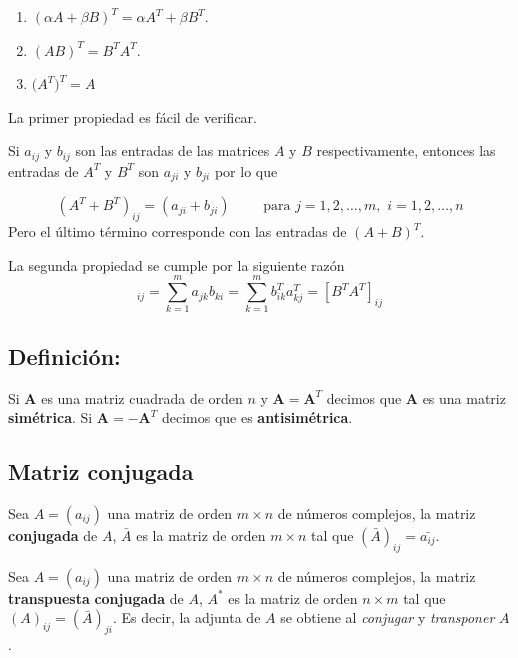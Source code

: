 \documentclass[
]{article}
\providecommand{\tightlist}{%
  \setlength{\itemsep}{0pt}\setlength{\parskip}{0pt}}
\begin{document}
\begin{enumerate}
\def\labelenumi{\arabic{enumi})}
\tightlist
\item
  \((\alpha A + \beta B)^{T} = \alpha A^{T} + \beta B^{T}\).
\item
  \((AB)^{T} = B^{T}A^{T}\).
\item
  \(\big(A^{T}\big)^{T}=A\)
\end{enumerate}

La primer propiedad es fácil de verificar.

Si \(a_{ij}\) y \(b_{ij}\) son las entradas de las matrices \(A\) y
\(B\) respectivamente, entonces las entradas de \(A^{T}\) y \(B^{T}\)
son \(a_{ji}\) y \(b_{ji}\) por lo que

\[
(A^{T} + B^{T})_{ij} = (a_{ji}+b_{ji})\quad\quad\mbox{ para }j=1,2,\ldots,m,\,\,i=1,2,\ldots,n
\] Pero el último término corresponde con las entradas de \((A+B)^{T}\).

La segunda propiedad se cumple por la siguiente razón \begin{equation*}
  [(AB)^T]_{ij} = \sum_{k=1}^m a_{jk}b_{ki} = \sum_{k=1}^m b^T_{ik} a^T_{kj} = [B^TA^T]_{ij}
\end{equation*}

\hypertarget{definiciuxf3n-2}{%
\subsection{Definición:}\label{definiciuxf3n-2}}

Si \(\mathbf{A}\) es una matriz cuadrada de orden \(n\) y
\(\mathbf{A}=\mathbf{A}^{T}\) decimos que \(\mathbf{A}\) es una matriz
\textbf{simétrica}. Si \(\mathbf{A}=-\mathbf{A}^{T}\) decimos que es
\textbf{antisimétrica}.

\hypertarget{matriz-conjugada}{%
\subsection{Matriz conjugada}\label{matriz-conjugada}}

\small

Sea \(A=(a_{ij})\) una matriz de orden \(m\times n\) de números
complejos, la matriz \textbf{conjugada} de \(A\), \(\bar{A}\) es la
matriz de orden \(m\times n\) tal que \((\bar{A})_{ij}=\bar{a_{ij}}\).

Sea \(A=(a_{ij})\) una matriz de orden \(m\times n\) de números
complejos, la matriz \textbf{transpuesta} \textbf{conjugada} de \(A\),
\(A^{*}\) es la matriz de orden \(n\times m\) tal que
\((A)_{ij}=(\bar{A})_{ji}\). Es decir, la adjunta de \(A\) se obtiene al
\emph{conjugar} y \emph{transponer} \(A\).
\end{document}
